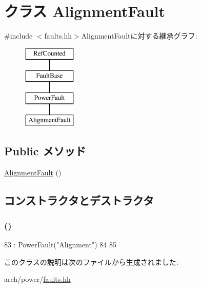 \hypertarget{classPowerISA_1_1AlignmentFault}{
\section{クラス AlignmentFault}
\label{classPowerISA_1_1AlignmentFault}
}


{\ttfamily \#include $<$faults.hh$>$}AlignmentFaultに対する継承グラフ:\begin{figure}[H]
\begin{center}
\leavevmode
\includegraphics[height=4cm]{classPowerISA_1_1AlignmentFault}
\end{center}
\end{figure}
\subsection*{Public メソッド}
\begin{DoxyCompactItemize}
\item 
\hyperlink{classPowerISA_1_1AlignmentFault_ad9587e95e598dbe271a59244da5e43f8}{AlignmentFault} ()
\end{DoxyCompactItemize}


\subsection{コンストラクタとデストラクタ}
\hypertarget{classPowerISA_1_1AlignmentFault_ad9587e95e598dbe271a59244da5e43f8}{
\subsubsection[{AlignmentFault}]{ ()}}
\label{classPowerISA_1_1AlignmentFault_ad9587e95e598dbe271a59244da5e43f8}



\begin{DoxyCode}
83         : PowerFault("Alignment")
84     {
85     }
\end{DoxyCode}


このクラスの説明は次のファイルから生成されました:\begin{DoxyCompactItemize}
\item 
arch/power/\hyperlink{arch_2power_2faults_8hh}{faults.hh}\end{DoxyCompactItemize}
